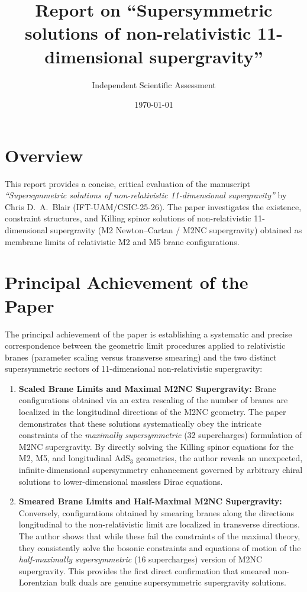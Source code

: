 \documentclass[11pt,a4paper]{article}
\title{\textbf{Report on ``Supersymmetric solutions of non-relativistic 11-dimensional supergravity''}}
\author{Independent Scientific Assessment}
\date{\today}
\begin{document}
\maketitle

\section*{Overview}
This report provides a concise, critical evaluation of the manuscript \emph{``Supersymmetric solutions of non-relativistic 11-dimensional supergravity''} by Chris D.~A.~Blair (IFT-UAM/CSIC-25-26). The paper investigates the existence, constraint structures, and Killing spinor solutions of non-relativistic 11-dimensional supergravity (M2 Newton--Cartan / M2NC supergravity) obtained as membrane limits of relativistic M2 and M5 brane configurations.

\section{Principal Achievement of the Paper}
The principal achievement of the paper is establishing a systematic and precise correspondence between the geometric limit procedures applied to relativistic branes (parameter scaling versus transverse smearing) and the two distinct supersymmetric sectors of 11-dimensional non-relativistic supergravity:
\begin{enumerate}
    \item \textbf{Scaled Brane Limits and Maximal M2NC Supergravity:} 
    Brane configurations obtained via an extra rescaling of the number of branes are localized in the longitudinal directions of the M2NC geometry. The paper demonstrates that these solutions systematically obey the intricate constraints of the \emph{maximally supersymmetric} (32 supercharges) formulation of M2NC supergravity. By directly solving the Killing spinor equations for the M2, M5, and longitudinal $\mathrm{AdS}_3$ geometries, the author reveals an unexpected, infinite-dimensional supersymmetry enhancement governed by arbitrary chiral solutions to lower-dimensional massless Dirac equations.
    
    \item \textbf{Smeared Brane Limits and Half-Maximal M2NC Supergravity:} 
    Conversely, configurations obtained by smearing branes along the directions longitudinal to the non-relativistic limit are localized in transverse directions. The author shows that while these fail the constraints of the maximal theory, they consistently solve the bosonic constraints and equations of motion of the \emph{half-maximally supersymmetric} (16 supercharges) version of M2NC supergravity. This provides the first direct confirmation that smeared non-Lorentzian bulk duals are genuine supersymmetric supergravity solutions.
\end{enumerate}
\end{document}
